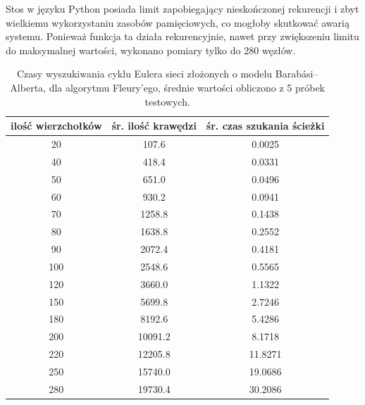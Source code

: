 \documentclass[a4paper, 12pt, twoside, openright]{article}
\begin{document}
	Stos w języku Python posiada limit zapobiegający nieskończonej rekurencji i zbyt wielkiemu wykorzystaniu zasobów pamięciowych, co mogłoby skutkować awarią systemu. Ponieważ funkcja ta działa rekurencyjnie, nawet przy zwiększeniu limitu do maksymalnej wartości, wykonano pomiary tylko do 280 węzłów.
\\
\begin{table}[ht]
	\centering
	\caption{Czasy wyszukiwania cyklu Eulera sieci złożonych o modelu Barabási–Alberta, dla algorytmu Fleury'ego, średnie wartości obliczono z 5 próbek testowych.}
	
	\resizebox{14.5cm}{!}
	{
	\begin{tabular}{|c c c|}
		\hline
		ilość wierzchołków	& śr. ilość krawędzi 	& śr. czas szukania ścieżki	\\ \hline \hline
		20 	& 107.6 	 	& 0.0025	\\ \hline
		40 	& 418.4 		& 0.0331	\\ \hline
		50 	& 651.0 	 	& 0.0496	\\ \hline
		60 	& 930.2 		& 0.0941	\\ \hline
		70 	& 1258.8      	& 0.1438	\\ \hline
		80 	& 1638.8     	& 0.2552	\\ \hline
		90  & 2072.4    	& 0.4181	\\ \hline
		100 & 2548.6    	& 0.5565	\\ \hline
		120 & 3660.0    	& 1.1322	\\ \hline
		150 & 5699.8   		& 2.7246	\\ \hline
		180 & 8192.6     	& 5.4286	\\ \hline
		200 & 10091.2 		& 8.1718	\\ \hline
		220 & 12205.8 		& 11.8271	\\ \hline
		250 & 15740.0 		& 19.0686	\\ \hline
		280 & 19730.4 		& 30.2086	\\ \hline
	\end{tabular} 
	}
	\label{Tab:BA_Fleury}
\end{table}
\end{document}
